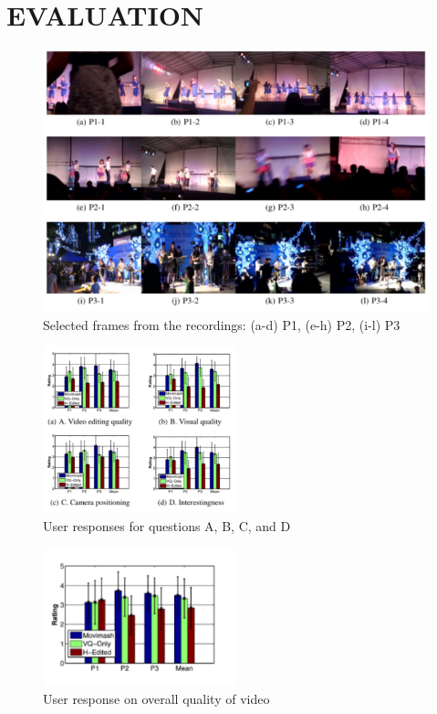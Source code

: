\documentclass{new}
\begin{document}
\section{EVALUATION}
\begin{figure}[h]
    \centering
    \includegraphics[width=01\textwidth]{img6.png}
    \caption{Selected frames from the recordings: (a-d) P1, (e-h) P2, (i-l) P3}
    \label{fig:mesh6}
\end{figure}
\begin{figure}[h]
    \centering
    \includegraphics[width=0.5\textwidth]{img7.png}
    \caption{User responses for questions A, B, C, and D}
    \label{fig:mesh7}
\end{figure}


\begin{figure}[h]
    \centering
    \includegraphics[width=0.5\textwidth]{img8.png}
    \caption{User response on overall quality of video}
    \label{fig:mesh8}
\end{figure}
\end{document}
